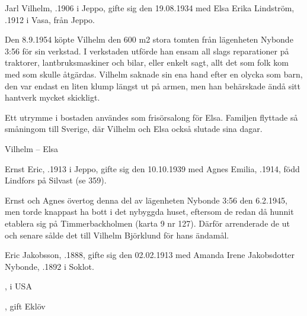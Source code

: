 Jarl Vilhelm, .1906 i Jeppo, gifte sig den 19.08.1934 med Elsa Erika Lindström, .1912 i Vasa, från Jeppo.
\begin{jhchildren}
  \item {}
  \item {}
\end{jhchildren}

Den 8.9.1954 köpte Vilhelm den 600 m2 stora tomten från lägenheten Nybonde 3:56 för sin verkstad. I verkstaden utförde han ensam all slags reparationer på traktorer, lantbruksmaskiner och bilar, eller enkelt sagt, allt det som folk kom med som skulle åtgärdas. Vilhelm saknade sin ena hand efter en olycka som barn, den var 	endast en liten klump längst ut på armen, men han behärskade ändå sitt hantverk mycket skickligt.

Ett utrymme i bostaden användes som frisörsalong för Elsa. Familjen flyttade så småningom till Sverige, där Vilhelm och Elsa också slutade sina dagar.

Vilhelm   --  Elsa 


Ernst Eric, .1913 i Jeppo, gifte sig den 10.10.1939 med Agnes Emilia, .1914, född Lindfors på Silvast (se 359).
\begin{jhchildren}
  \item {}
  \item {}
  \item {}
\end{jhchildren}

Ernst och Agnes övertog denna del av lägenheten Nybonde 3:56 den 6.2.1945, men torde knappast ha bott i det nybyggda huset, eftersom 	de redan då hunnit etablera sig på Timmerbackholmen (karta 9 nr 127). Därför arrenderade de ut och senare sålde det till Vilhelm Björklund för hans ändamål.


Eric Jakobsson, .1888, gifte sig den 02.02.1913 med Amanda Irene Jakobsdotter Nybonde, .1892 i Soklot.
\begin{jhchildren}
  \item {}, i USA
  \item {}
  \item {}, gift Eklöv
\end{jhchildren}

